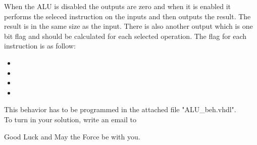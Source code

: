 \documentclass[a4paper,12pt]{article}
\begin{document}
When the ALU is disabled the outputs are zero and when it is enabled it performs the seleced instruction on the inputs and then outputs the result. The result is in the same size as the input. There is also another output which is one bit flag and should be calculated for each selected operation. The flag for each instruction is as follow:
\begin{itemize}
\item %
\item %
\item %
\item %
\end{itemize}
\vspace{0.3cm}

This behavior has to be programmed in the attached file "ALU\_beh.vhdl". 
\\

To turn in your solution, write an email to %

\vspace{0.7cm}

Good Luck and May the Force be with you.
\end{document}
